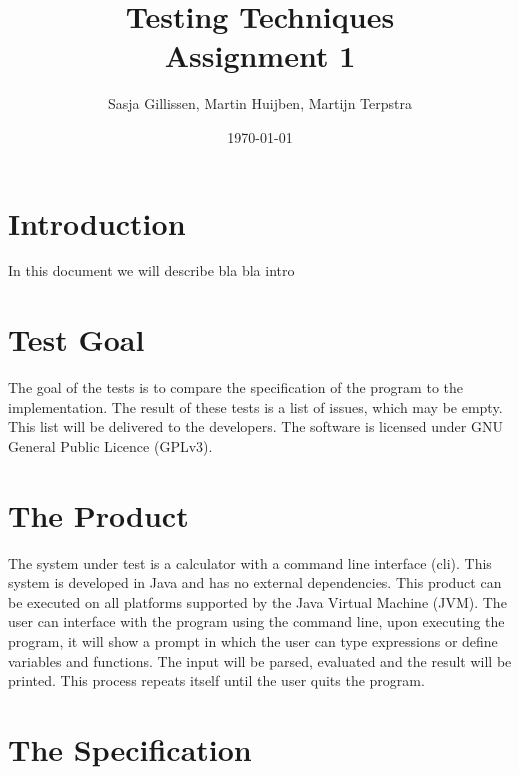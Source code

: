 \documentclass[11pt,a4paper]{article}
\author{Sasja Gillissen, Martin Huijben, Martijn Terpstra}
\date{\today}
\title{Testing Techniques\\
  \textbf{Assignment 1}}
\begin{document}
\maketitle

\section{Introduction}
In this document we will describe
bla bla intro

\section{Test Goal}
The goal of the tests is to compare the specification of the program to the implementation. The result of these tests is a list of issues, which may be empty. This list will be delivered to the developers. The software is licensed under GNU General Public Licence (GPLv3).



\section{The Product}
The system under test is a calculator with a command line interface (cli). This system is developed in Java and has no external dependencies. This product can be executed on all platforms supported by the Java Virtual Machine (JVM). The user can interface with the program using the command line, upon executing the program, it will show a prompt in which the user can type expressions or define variables and functions. The input will be parsed, evaluated and the result will be printed. This process repeats itself until the user quits the program.


\section{The Specification}
\end{document}
